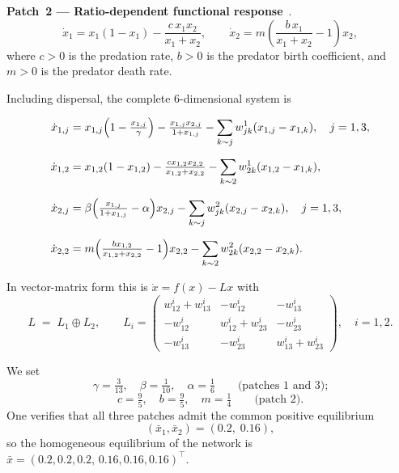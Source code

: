 \documentclass[12pt,a4paper]{article}
\theoremstyle{definition}
\begin{document}
\medskip
\noindent\textbf{Patch~2 --- Ratio-dependent functional
response}~\cite{kumar2014}.
\begin{equation*}
  \dot{x}_1 = x_1(1 - x_1) - \frac{c\,x_1 x_2}{x_1 + x_2},
  \qquad
  \dot{x}_2 = m\!\left(\frac{b\,x_1}{x_1 + x_2} - 1\right)\!x_2,
  \label{eq:ratiodep}
\end{equation*}
where $c > 0$ is the predation rate, $b > 0$ is the predator birth
coefficient, and $m > 0$ is the predator death rate.


Including dispersal, the complete $6$-dimensional system is

\begin{align*}
\dot{x}_{1,j} &= x_{1,j}\Bigl(1 - \tfrac{x_{1,j}}{\gamma}\Bigr) 
  - \tfrac{x_{1,j}x_{2,j}}{1+x_{1,j}} 
  - \sum_{k\sim j} w^1_{jk}(x_{1,j} - x_{1,k}), \quad j=1,3, \\[6pt]
\dot{x}_{1,2} &= x_{1,2}(1 - x_{1,2}) 
  - \tfrac{c x_{1,2} x_{2,2}}{x_{1,2} + x_{2,2}} 
  - \sum_{k\sim 2} w^1_{2k}(x_{1,2} - x_{1,k}), \\[8pt]
\dot{x}_{2,j} &= \beta\Bigl(\tfrac{x_{1,j}}{1+x_{1,j}} - \alpha\Bigr) x_{2,j} 
  - \sum_{k\sim j} w^2_{jk}(x_{2,j} - x_{2,k}), \quad j=1,3, \\[6pt]
\dot{x}_{2,2} &= m\Bigl(\tfrac{b x_{1,2}}{x_{1,2} + x_{2,2}} - 1\Bigr) x_{2,2} 
  - \sum_{k\sim 2} w^2_{2k}(x_{2,2} - x_{2,k}).
\end{align*}

In vector-matrix form this is $\dot{x} = f(x) - Lx$ with
\begin{equation*}
  L \;=\; L_1 \oplus L_2,
  \qquad
  L_i
  = \begin{pmatrix}
      w^i_{12}+w^i_{13} & -w^i_{12} & -w^i_{13} \\
      -w^i_{12} & w^i_{12}+w^i_{23} & -w^i_{23} \\
      -w^i_{13} & -w^i_{23} & w^i_{13}+w^i_{23}
    \end{pmatrix},
  \quad i = 1,2.
  \label{eq:ex1_Lap}
\end{equation*}


We set
\begin{equation}
  \gamma = \tfrac{3}{13},\quad
  \beta  = \tfrac{1}{10},\quad
  \alpha = \tfrac{1}{6}
  \qquad\text{(patches 1 and 3);}
  \label{eq:ex1_par13}
\end{equation}
\begin{equation}
  c = \tfrac{9}{5},\quad
  b = \tfrac{9}{5},\quad
  m = \tfrac{1}{4}
  \qquad\text{(patch 2).}
  \label{eq:ex1_par2}
\end{equation}
One verifies that all three patches admit the common positive
equilibrium
\begin{equation}
  (\bar{x}_1,\bar{x}_2) = (0.2,\;0.16),
  \label{eq:ex1_equil}
\end{equation}
so the homogeneous equilibrium of the network is
$\bar{x} = (0.2,0.2,0.2,\,0.16,0.16,0.16)^{\top}$.
\end{document}
